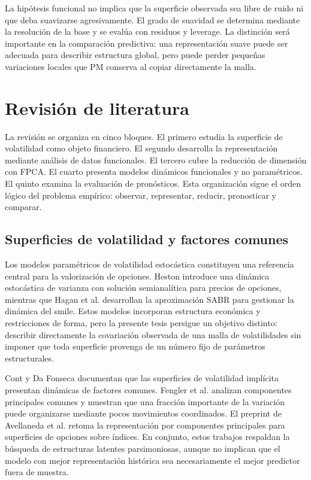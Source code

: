 \documentclass[a4paper,11pt]{article}
\begin{document}
La hipótesis funcional no implica que la superficie observada sea libre de ruido ni que deba suavizarse agresivamente. El grado de suavidad se determina mediante la resolución de la base y se evalúa con residuos y leverage. La distinción será importante en la comparación predictiva: una representación suave puede ser adecuada para describir estructura global, pero puede perder pequeñas variaciones locales que PM conserva al copiar directamente la malla.

\section{Revisión de literatura}

La revisión se organiza en cinco bloques. El primero estudia la superficie de volatilidad como objeto financiero. El segundo desarrolla la representación mediante análisis de datos funcionales. El tercero cubre la reducción de dimensión con FPCA. El cuarto presenta modelos dinámicos funcionales y no paramétricos. El quinto examina la evaluación de pronósticos. Esta organización sigue el orden lógico del problema empírico: observar, representar, reducir, pronosticar y comparar.

\subsection{Superficies de volatilidad y factores comunes}

Los modelos paramétricos de volatilidad estocástica constituyen una referencia central para la valorización de opciones. Heston \cite{Heston1993} introduce una dinámica estocástica de varianza con solución semianalítica para precios de opciones, mientras que Hagan et al. \cite{Hagan2002} desarrollan la aproximación SABR para gestionar la dinámica del smile. Estos modelos incorporan estructura económica y restricciones de forma, pero la presente tesis persigue un objetivo distinto: describir directamente la covariación observada de una malla de volatilidades sin imponer que toda superficie provenga de un número fijo de parámetros estructurales.

Cont y Da Fonseca \cite{ContDaFonseca2002} documentan que las superficies de volatilidad implícita presentan dinámicas de factores comunes. Fengler et al. \cite{Fengler2003} analizan componentes principales comunes y muestran que una fracción importante de la variación puede organizarse mediante pocos movimientos coordinados. El preprint de Avellaneda et al. \cite{Avellaneda2020} retoma la representación por componentes principales para superficies de opciones sobre índices. En conjunto, estos trabajos respaldan la búsqueda de estructuras latentes parsimoniosas, aunque no implican que el modelo con mejor representación histórica sea necesariamente el mejor predictor fuera de muestra.
\end{document}
